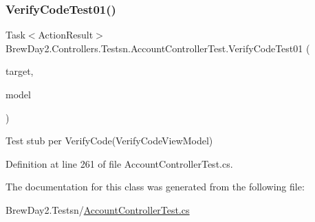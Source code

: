 \subsubsection{\texorpdfstring{Verify\+Code\+Test01()}{VerifyCodeTest01()}}
{\footnotesize\ttfamily Task$<$Action\+Result$>$ Brew\+Day2.\+Controllers.\+Testsn.\+Account\+Controller\+Test.\+Verify\+Code\+Test01 (\begin{DoxyParamCaption}\item[{\mbox{[}\+Pex\+Assume\+Under\+Test\mbox{]} \mbox{\hyperlink{class_brew_day2_1_1_controllers_1_1_account_controller}{Account\+Controller}}}]{target,  }\item[{\mbox{\hyperlink{class_brew_day2_1_1_models_1_1_verify_code_view_model}{Verify\+Code\+View\+Model}}}]{model }\end{DoxyParamCaption})}



Test stub per Verify\+Code(\+Verify\+Code\+View\+Model)



Definition at line 261 of file Account\+Controller\+Test.\+cs.



The documentation for this class was generated from the following file\+:\begin{DoxyCompactItemize}
\item 
Brew\+Day2.\+Testsn/\mbox{\hyperlink{_2_account_controller_test_8cs}{Account\+Controller\+Test.\+cs}}\end{DoxyCompactItemize}
